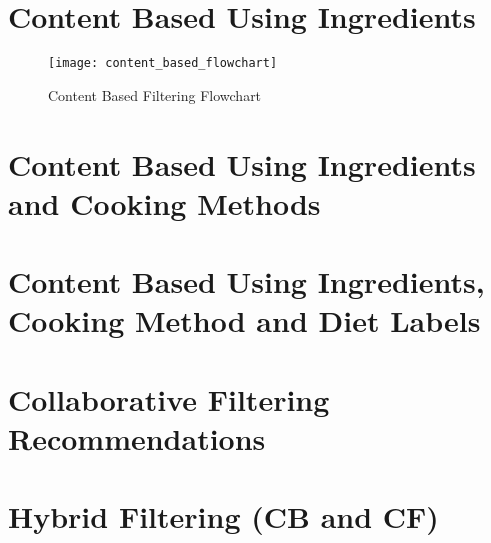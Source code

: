 \section{Content Based Using Ingredients}
\begin{figure}[H]
	\centering
	\texttt{[image: content\_based\_flowchart]}
	\caption{Content Based Filtering Flowchart }
	\label{fig:content_based_flowchart}
\end{figure}  


\section{Content Based Using Ingredients and Cooking Methods}
\section{Content Based Using Ingredients, Cooking Method and Diet Labels}
\section{Collaborative Filtering Recommendations}
\section{Hybrid Filtering (CB and CF)}